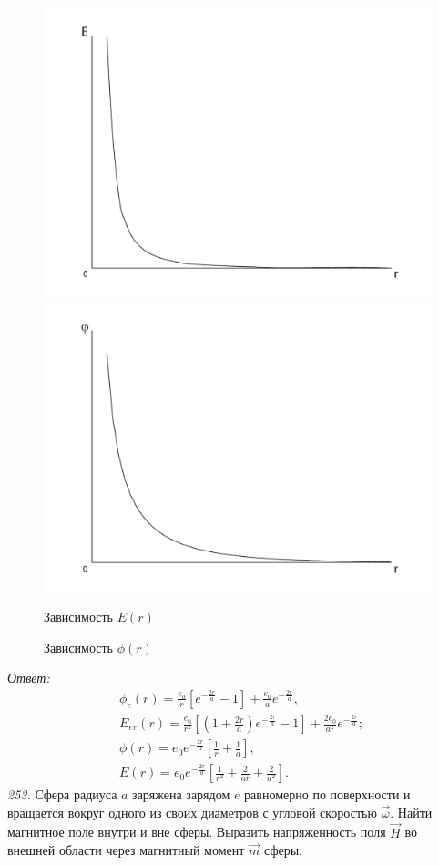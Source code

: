     \begin{figure}
        \center
        \includegraphics[width=.47\textwidth]{field}\hfill
        \includegraphics[width=.47\textwidth]{potential}
        \parbox{.47\textwidth}{\centering Зависимость \( E(r) \)}\hfill
        \parbox{.47\textwidth}{\centering Зависимость \( \phi(r) \)}
    \end{figure}

\vspace*{2em}        
\emph{Ответ:}
    \begin{align*}
        & \phi_e(r) = \frac{e_0}{r}\left[e^{-\frac{2r}{a}} - 1\right] +
        \frac{e_0}{a}e^{-\frac{2r}{a}}, \\
        & E_{er}(r) = \frac{e_0}{r^2}\left[\left(1 + \frac{2r}{a}\right)
        e^{-\frac{2r}{a}} - 1\right] + \frac{2e_0}{a^2}e^{-\frac{2r}{a}}; \\
        & \phi(r) = e_0e^{-\frac{2r}{a}}\left[\frac{1}{r} + \frac{1}{a}\right], \\
        & E(r) = e_0e^{-\frac{2r}{a}}\left[\frac{1}{r^2} + \frac{2}{ar} +
        \frac{2}{a^2}\right].
    \end{align*}
\newpage
\emph{253.} Сфера радиуса \( a \) заряжена зарядом \( e \) равномерно по
поверхности и вращается вокруг одного из своих диаметров с угловой скоростью
\( \vec{\omega} \). Найти магнитное поле внутри и вне сферы. Выразить
напряженность поля \( \vec{H} \) во внешней области через магнитный момент
\( \vec{m} \) сферы.

